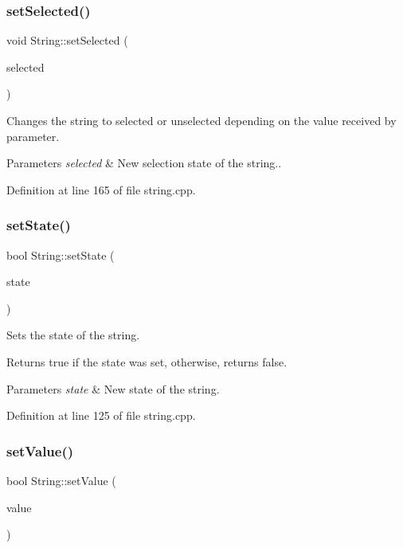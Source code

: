 \subsubsection{\texorpdfstring{set\+Selected()}{setSelected()}}
{\footnotesize\ttfamily void String\+::set\+Selected (\begin{DoxyParamCaption}\item[{bool}]{selected }\end{DoxyParamCaption})}



Changes the string to selected or unselected depending on the value received by parameter. 


\begin{DoxyParams}{Parameters}
{\em selected} & New selection state of the string.. \\
\hline
\end{DoxyParams}


Definition at line 165 of file string.\+cpp.

\mbox{\label{classString_a7b1b070889aef0e2e9eb4d7d55161cf3}} 
\subsubsection{\texorpdfstring{set\+State()}{setState()}}
{\footnotesize\ttfamily bool String\+::set\+State (\begin{DoxyParamCaption}\item[{const Q\+String \&}]{state }\end{DoxyParamCaption})}



Sets the state of the string. 

Returns true if the state was set, otherwise, returns false. 
\begin{DoxyParams}{Parameters}
{\em state} & New state of the string. \\
\hline
\end{DoxyParams}


Definition at line 125 of file string.\+cpp.

\mbox{\label{classString_ae863781e31fe2378468547159a9172a6}} 
\subsubsection{\texorpdfstring{set\+Value()}{setValue()}}
{\footnotesize\ttfamily bool String\+::set\+Value (\begin{DoxyParamCaption}\item[{const Q\+String \&}]{value }\end{DoxyParamCaption})}



